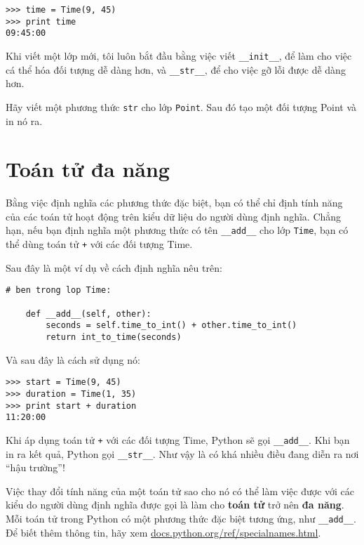 \documentclass[11pt]{book}
\begin{document}

\beforeverb
\begin{verbatim}
>>> time = Time(9, 45)
>>> print time
09:45:00
\end{verbatim}
\afterverb
%
Khi viết một lớp mới, tôi luôn bắt đầu bằng việc viết 
\verb"__init__", để làm cho việc cá thể hóa đối tượng dễ dàng hơn, và
\verb"__str__", để cho việc gỡ lỗi được dễ dàng hơn.


\begin{ex}
Hãy viết một phương thức {\tt str} cho lớp {\tt Point}. Sau đó tạo một
đối tượng Point và in nó ra.
\end{ex}


\section{Toán tử đa năng}
\label{operator overloading}

Bằng việc định nghĩa các phương thức đặc biệt, bạn có thể chỉ định
tính năng của các toán tử hoạt động trên kiểu dữ liệu do người dùng
định nghĩa. Chẳng hạn, nếu bạn định nghĩa một phương thức có tên
\verb"__add__" cho lớp {\tt Time}, bạn có thể dùng toán tử
{\tt +} với các đối tượng Time.

Sau đây là một ví dụ về cách định nghĩa nêu trên:


\beforeverb
\begin{verbatim}
# ben trong lop Time:

    def __add__(self, other):
        seconds = self.time_to_int() + other.time_to_int()
        return int_to_time(seconds)
\end{verbatim}
\afterverb
%
Và sau đây là cách sử dụng nó:

\beforeverb
\begin{verbatim}
>>> start = Time(9, 45)
>>> duration = Time(1, 35)
>>> print start + duration
11:20:00
\end{verbatim}
\afterverb
%
Khi áp dụng toán tử {\tt +} với các đối tượng Time, Python sẽ gọi
\verb"__add__".  Khi bạn in ra kết quả, Python gọi 
\verb"__str__".  Như vậy là có khá nhiều điều đang diễn ra nơi ``hậu trường''!


Việc thay đổi tính năng của một toán tử sao cho nó có thể làm việc
được với các kiểu do người dùng định nghĩa được gọi là làm cho 
{\bf toán tử} trở nên {\bf đa năng}.  Mỗi toán tử
trong Python có một phương thức đặc biệt tương ứng, như 
\verb"__add__".  Để biết thêm thông tin, hãy xem 
\url{docs.python.org/ref/specialnames.html}.
\end{document}
